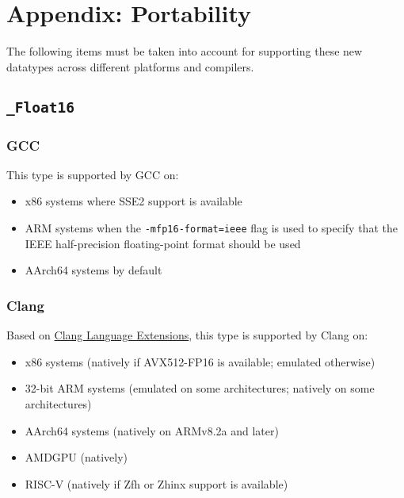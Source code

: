 \documentclass[../HDF5_RFC.tex]{subfiles}
\begin{document}
\newpage

\section{Appendix: Portability}
\label{apdx:portability}

The following items must be taken into account for supporting these new datatypes across different
platforms and compilers.

\subsection{\texttt{\_Float16}}

\subsubsection{GCC}

This type is supported by GCC on:

\begin{itemize}
    \item x86 systems where SSE2 support is available
    \item ARM systems when the \texttt{-mfp16-format=ieee} flag is used to specify that the IEEE
          half-precision floating-point format should be used
    \item AArch64 systems by default
\end{itemize}

\subsubsection{Clang}

Based on \href{https://clang.llvm.org/docs/LanguageExtensions.html#half-precision-floating-point}{Clang Language Extensions},
this type is supported by Clang on:

\begin{itemize}
    \item x86 systems (natively if AVX512-FP16 is available; emulated otherwise)
    \item 32-bit ARM systems (emulated on some architectures; natively on some architectures)
    \item AArch64 systems (natively on ARMv8.2a and later)
    \item AMDGPU (natively)
    \item RISC-V (natively if Zfh or Zhinx support is available)
\end{itemize}
\end{document}
